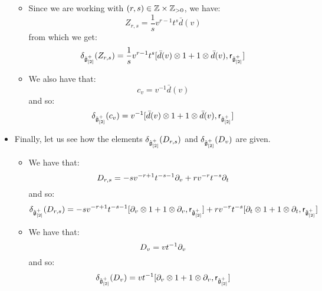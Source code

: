 \begin{remark}
\begin{itemize}
                    \begin{itemize}
                        \item Since we are working with $(r, s) \in \Z \x \Z_{> 0}$, we have:
                            $$Z_{r, s} = \frac1s v^{r - 1} t^s \bar{d}(v)$$
                        from which we get:
                            $$\delta_{\hat{\g}_{[2]}^+}(Z_{r, s}) = \frac1s v^{r - 1} t^s [\bar{d}(v) \tensor 1 + 1 \tensor \bar{d}(v), \sfr_{\hat{\g}_{[2]}^+}]$$
                        \item We also have that:
                            $$c_v = v^{-1} \bar{d}(v)$$
                        and so:
                            $$\delta_{\hat{\g}_{[2]}^+}(c_v) = v^{-1} [\bar{d}(v) \tensor 1 + 1 \tensor \bar{d}(v), \sfr_{\hat{\g}_{[2]}^+}]$$
                    \end{itemize}
                    \item Finally, let us see how the elements $\delta_{\hat{\mathfrak{g}}_{[2]}^+}(D_{r, s})$ and $\delta_{\hat{\mathfrak{g}}_{[2]}^+}(D_v)$ are given.
                    \begin{itemize}
                        \item We have that:
                            $$D_{r, s} = -s v^{-r + 1} t^{-s - 1} \partial_v + r v^{-r} t^{-s} \partial_t$$
                        and so:
                            $$\delta_{\hat{\g}_{[2]}^+}(D_{r, s}) = -s v^{-r + 1} t^{-s - 1} [\del_v \tensor 1 + 1 \tensor \del_v, \sfr_{\hat{\g}_{[2]}^+}] + r v^{-r} t^{-s} [\del_t \tensor 1 + 1 \tensor \del_t, \sfr_{\hat{\g}_{[2]}^+}]$$
                        \item We have that:
                            $$D_v = v t^{-1} \partial_v$$
                        and so:
                            $$\delta_{\hat{\g}_{[2]}^+}(D_v) = v t^{-1} [\del_v \tensor 1 + 1 \tensor \del_v, \sfr_{\hat{\g}_{[2]}^+}]$$
                    \end{itemize}
                \end{itemize}
            \end{remark}

